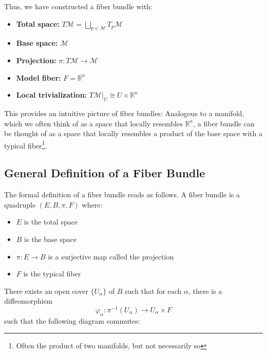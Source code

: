 Thus, we have constructed a fiber bundle with:
\begin{itemize}
  \item \textbf{Total space:} $T\mathcal{M} = \bigsqcup_{p \in \mathcal{M}} T_p\mathcal{M}$
  \item \textbf{Base space:} $\mathcal{M}$
  \item \textbf{Projection:} $\pi: T\mathcal{M} \to \mathcal{M}$
  \item \textbf{Model fiber:} $F = \mathbb{R}^n$
  \item \textbf{Local trivialization:} $T\mathcal{M}|_U \cong U \times \mathbb{R}^n$
\end{itemize}

This provides an intuitive picture of fiber bundles:  
Analogous to a manifold, which we often think of as a space that locally resembles $\mathbb{R}^n$, a fiber bundle can be thought of as a space that locally resembles a product of the base space with a typical fiber\footnote{Often the product of two manifolds, but not necessarily so}.

\subsection*{General Definition of a Fiber Bundle}

The formal definition of a fiber bundle reads as follows.
A fiber bundle is a quadruple $(E, B, \pi, F)$ where:
\begin{itemize}
  \item $E$ is the total space
  \item $B$ is the base space
  \item $\pi: E \to B$ is a surjective map called the projection
  \item $F$ is the typical fiber
\end{itemize}

There exists an open cover $\{U_\alpha\}$ of $B$ such that for each $\alpha$, there is a diffeomorphism
\[
\varphi_\alpha: \pi^{-1}(U_\alpha) \to U_\alpha \times F
\]
such that the following diagram commutes:


\begin{center}
\end{center}



